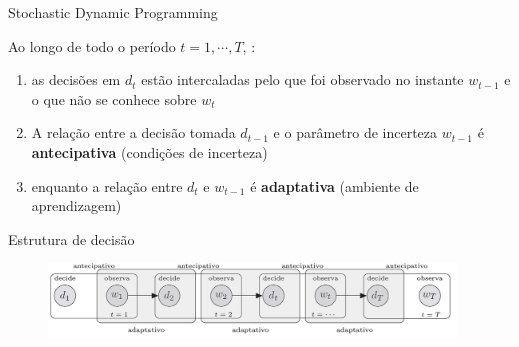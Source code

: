 \documentclass{beamer}
\begin{document}
\begin{frame}{Stochastic Dynamic Programming}

Ao longo de todo o período $t=1,\cdots,T$, \citep{Kouwenberg2008}:

\begin{enumerate}
\item as decisões em $d_t$ estão intercaladas pelo que foi observado no instante $w_{t-1}$ e o que não se conhece sobre $w_{t}$
\item A relação entre a decisão tomada $d_{t-1}$ e o parâmetro de incerteza $w_{t-1}$ é \textbf{antecipativa} (condições de incerteza)
\item enquanto a relação entre $d_t$ e $w_{t-1}$ é \textbf{adaptativa} (ambiente de aprendizagem)
\end{enumerate} 

\end{frame}


\begin{frame}{Estrutura de decisão}
\begin{figure}
\begin{center}
 \includegraphics[height=2cm,keepaspectratio]{processo_adapt_antecipa.png}
 \end{center}
\label{fig:sadsad}
\end{figure}

\end{frame}
\end{document}

